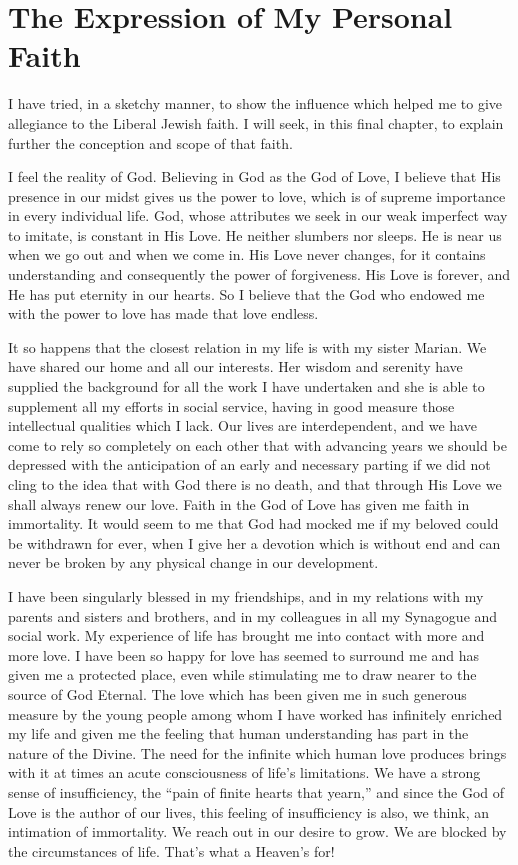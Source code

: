 \chapter{The Expression of My Personal Faith}

I have tried, in a sketchy manner, to show the
influence which helped me to give allegiance to the
Liberal Jewish faith. I will seek, in this final chapter,
to explain further the conception and scope of that faith.

I feel the reality of God. Believing in God as
the God of Love, I believe that His presence in our
midst gives us the power to love, which is of supreme
importance in every individual life. God, whose
attributes we seek in our weak imperfect way to imitate,
is constant in His Love. He neither slumbers nor sleeps.
He is near us when we go out and when we come in. His
Love never changes, for it contains understanding and
consequently the power of forgiveness. His Love is
forever, and He has put eternity in our hearts. So I
believe that the God who endowed me with the power to
love has made that love endless.

It so happens that the closest relation in my life is
with my sister Marian. We have shared our home and all
our interests. Her wisdom and serenity have supplied
the background for all the work I have undertaken and
she is able to supplement all my efforts in social service,
having in good measure those intellectual qualities
which I lack. Our lives are interdependent, and we have
come to rely so completely on each other that with
advancing years we should be depressed with the anticipation
of an early and necessary parting if we did not
cling to the idea that with God there is no death, and
that through His Love we shall always renew our love.
Faith in the God of Love has given me faith in immortality.
It would seem to me that God had mocked me if my
beloved could be withdrawn for ever, when I give her a
devotion which is without end and can never be broken
by any physical change in our development.

I have been singularly blessed in my friendships,
and in my relations with my parents and sisters and
brothers, and in my colleagues in all my Synagogue and
social work. My experience of life has brought me into
contact with more and more love. I have been so happy
for love has seemed to surround me and has given me
a protected place, even while stimulating me to draw
nearer to the source of God Eternal. The love which has
been given me in such generous measure by the young
people among whom I have worked has infinitely enriched
my life and given me the feeling that human understanding
has part in the nature of the Divine. The need for
the infinite which human love produces brings with it at
times an acute consciousness of life’s limitations. We
have a strong sense of insufficiency, the “pain of finite
hearts that yearn,” and since the God of Love is the
author of our lives, this feeling of insufficiency is also,
we think, an intimation of immortality. We reach out
in our desire to grow. We are blocked by the circumstances
of life. That’s what a Heaven’s for!

